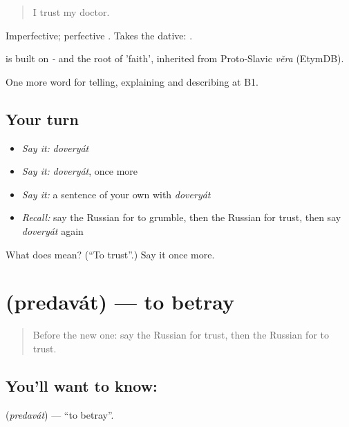 \begin{quote}
I trust my doctor.
\end{quote}

Imperfective; perfective . Takes the dative: \emph{ }.

\begin{cousinweb}
\emph{} is built on \emph{-} and the root of \emph{} 'faith', inherited from Proto-Slavic \emph{věra} (EtymDB).
\end{cousinweb}

\begin{grammarlens}[title={What you've built}]
One more word for telling, explaining and describing at B1.
\end{grammarlens}

\subsection*{Your turn}
\begin{itemize}
\raggedright
  \item \emph{Say it:} \emph{doveryát}
  \item \emph{Say it:} \emph{doveryát}, once more
  \item \emph{Say it:} a sentence of your own with \emph{doveryát}
  \item \emph{Recall:} say the Russian for to grumble, then the Russian for trust, then say \emph{doveryát} again
\end{itemize}

\begin{tcolorbox}[breakable,colback=teal!4,colframe=teal!35!black,title={Before you move on}]
What does  mean? (\textquotedblleft{}To trust\textquotedblright{}.) Say it once more.
\end{tcolorbox}
\section[\texorpdfstring{\ru{предавать} (predavát)}{предавать (predavát)}]{ (predavát) — to betray}

\label{lesson:RU-C479-predavat}



\begin{quote}
Before the new one: say the Russian for trust, then the Russian for to trust.
\end{quote}

\subsection*{You'll want to know: }
\textbf{} (\emph{predavát}) — \textquotedblleft{}to betray\textquotedblright{}.


